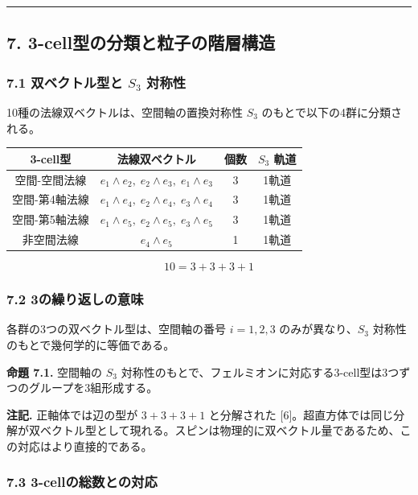\documentclass[a4paper,11pt]{ltjsarticle}
\newcounter{none}
\begin{document}
\begin{center}\rule{0.5\linewidth}{0.5pt}\end{center}

\subsection*{7. 3-cell型の分類と粒子の階層構造}

\subsubsection*{7.1 双ベクトル型と $S_3$ 対称性}

10種の法線双ベクトルは、空間軸の置換対称性 $S_3$ のもとで以下の4群に分類される。

{\def\LTcaptype{none}
\begin{longtable}[]{@{}cccc@{}}
\toprule
3-cell型 & 法線双ベクトル & 個数 & $S_3$ 軌道 \\
\midrule
\endhead
\bottomrule
\endlastfoot
空間-空間法線 & $e_1 \wedge e_2, \; e_2 \wedge e_3, \; e_1 \wedge e_3$ & 3 & 1軌道 \\
空間-第4軸法線 & $e_1 \wedge e_4, \; e_2 \wedge e_4, \; e_3 \wedge e_4$ & 3 & 1軌道 \\
空間-第5軸法線 & $e_1 \wedge e_5, \; e_2 \wedge e_5, \; e_3 \wedge e_5$ & 3 & 1軌道 \\
非空間法線 & $e_4 \wedge e_5$ & 1 & 1軌道 \\
\end{longtable}
}

\[10 = 3 + 3 + 3 + 1\]

\subsubsection*{7.2 3の繰り返しの意味}

各群の3つの双ベクトル型は、空間軸の番号 $i = 1, 2, 3$ のみが異なり、$S_3$ 対称性のもとで幾何学的に等価である。

\textbf{命題 7.1.} 空間軸の $S_3$ 対称性のもとで、フェルミオンに対応する3-cell型は3つずつのグループを3組形成する。

\textbf{注記.} 正軸体では辺の型が $3 + 3 + 3 + 1$ と分解された [6]。超直方体では同じ分解が双ベクトル型として現れる。スピンは物理的に双ベクトル量であるため、この対応はより直接的である。

\subsubsection*{7.3 3-cellの総数との対応}
\end{document}
